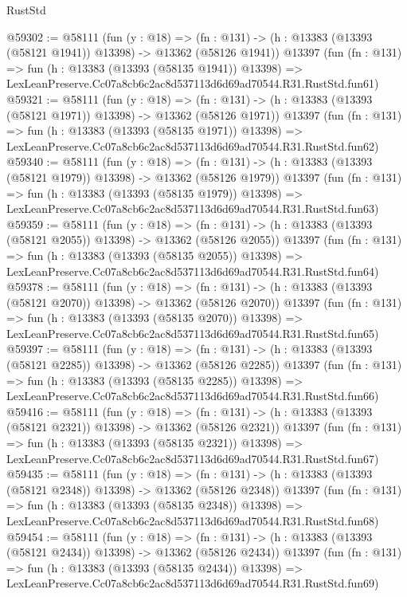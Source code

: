 \begin{lexlean}{RustStd}
\begin{coremodule}
@59302 := @58111
    (fun (y : @18) =>
    (fn : @131) -> (h : @13383 (@13393 (@58121 @1941)) @13398) -> @13362 (@58126 @1941))
    @13397
    (fun (fn : @131) =>
    fun (h : @13383 (@13393 (@58135 @1941)) @13398) =>
    LexLeanPreserve.Cc07a8cb6c2ac8d537113d6d69ad70544.R31.RustStd.fun61)
@59321 := @58111
    (fun (y : @18) =>
    (fn : @131) -> (h : @13383 (@13393 (@58121 @1971)) @13398) -> @13362 (@58126 @1971))
    @13397
    (fun (fn : @131) =>
    fun (h : @13383 (@13393 (@58135 @1971)) @13398) =>
    LexLeanPreserve.Cc07a8cb6c2ac8d537113d6d69ad70544.R31.RustStd.fun62)
@59340 := @58111
    (fun (y : @18) =>
    (fn : @131) -> (h : @13383 (@13393 (@58121 @1979)) @13398) -> @13362 (@58126 @1979))
    @13397
    (fun (fn : @131) =>
    fun (h : @13383 (@13393 (@58135 @1979)) @13398) =>
    LexLeanPreserve.Cc07a8cb6c2ac8d537113d6d69ad70544.R31.RustStd.fun63)
@59359 := @58111
    (fun (y : @18) =>
    (fn : @131) -> (h : @13383 (@13393 (@58121 @2055)) @13398) -> @13362 (@58126 @2055))
    @13397
    (fun (fn : @131) =>
    fun (h : @13383 (@13393 (@58135 @2055)) @13398) =>
    LexLeanPreserve.Cc07a8cb6c2ac8d537113d6d69ad70544.R31.RustStd.fun64)
@59378 := @58111
    (fun (y : @18) =>
    (fn : @131) -> (h : @13383 (@13393 (@58121 @2070)) @13398) -> @13362 (@58126 @2070))
    @13397
    (fun (fn : @131) =>
    fun (h : @13383 (@13393 (@58135 @2070)) @13398) =>
    LexLeanPreserve.Cc07a8cb6c2ac8d537113d6d69ad70544.R31.RustStd.fun65)
@59397 := @58111
    (fun (y : @18) =>
    (fn : @131) -> (h : @13383 (@13393 (@58121 @2285)) @13398) -> @13362 (@58126 @2285))
    @13397
    (fun (fn : @131) =>
    fun (h : @13383 (@13393 (@58135 @2285)) @13398) =>
    LexLeanPreserve.Cc07a8cb6c2ac8d537113d6d69ad70544.R31.RustStd.fun66)
@59416 := @58111
    (fun (y : @18) =>
    (fn : @131) -> (h : @13383 (@13393 (@58121 @2321)) @13398) -> @13362 (@58126 @2321))
    @13397
    (fun (fn : @131) =>
    fun (h : @13383 (@13393 (@58135 @2321)) @13398) =>
    LexLeanPreserve.Cc07a8cb6c2ac8d537113d6d69ad70544.R31.RustStd.fun67)
@59435 := @58111
    (fun (y : @18) =>
    (fn : @131) -> (h : @13383 (@13393 (@58121 @2348)) @13398) -> @13362 (@58126 @2348))
    @13397
    (fun (fn : @131) =>
    fun (h : @13383 (@13393 (@58135 @2348)) @13398) =>
    LexLeanPreserve.Cc07a8cb6c2ac8d537113d6d69ad70544.R31.RustStd.fun68)
@59454 := @58111
    (fun (y : @18) =>
    (fn : @131) -> (h : @13383 (@13393 (@58121 @2434)) @13398) -> @13362 (@58126 @2434))
    @13397
    (fun (fn : @131) =>
    fun (h : @13383 (@13393 (@58135 @2434)) @13398) =>
    LexLeanPreserve.Cc07a8cb6c2ac8d537113d6d69ad70544.R31.RustStd.fun69)

\end{coremodule}
\end{lexlean}
